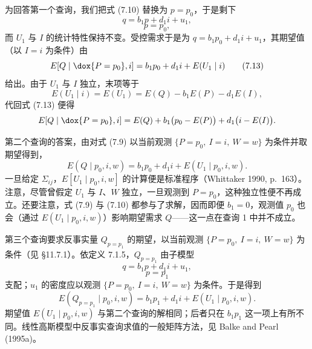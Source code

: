 为回答第一个查询，我们把式 \textup{(7.10)} 替换为 $p=p_0$，于是剩下
\begin{equation}
q=b_1p+d_1i+u_1, \tag{7.11}
\end{equation}
\begin{equation}
p=p_0, \tag{7.12}
\end{equation}
而 $U_1$ 与 $I$ 的统计特性保持不变。受控需求于是为 $q=b_1p_0+d_1i+u_1$，其期望值（以 $I=i$ 为条件）由
\begin{equation}
E[Q\mid \dox{P=p_0},i]=b_1p_0+d_1i+E(U_1\mid i) \tag{7.13}
\end{equation}
给出。由于 $U_1$ 与 $I$ 独立，末项等于
\[
E(U_1\mid i)=E(U_1)=E(Q)-b_1E(P)-d_1E(I),
\]
代回式 \textup{(7.13)} 便得
\[
E[Q\mid \dox{P=p_0},i]=E(Q)+b_1\bigl(p_0-E(P)\bigr)+d_1\bigl(i-E(I)\bigr).
\]

第二个查询的答案，由对式 \textup{(7.9)} 以当前观测 $\{P=p_0,\ I=i,\ W=w\}$ 为条件并取期望得到，
\begin{equation}
E(Q\mid p_0,i,w)=b_1p_0+d_1i+E(U_1\mid p_0,i,w). \tag{7.14}
\end{equation}
一旦给定 $\Sigma_{ij}$，$E[U_1\mid p_0,i,w]$ 的计算便是标准程序（Whittaker 1990, p.~163）。注意，尽管曾假定 $U_1$ 与 $I$、$W$ 独立，一旦观测到 $P=p_0$，这种独立性便不再成立。还要注意，式 \textup{(7.9)} 与 \textup{(7.10)} 都参与了求解，因而即便 $b_1=0$，观测值 $p_0$ 也会（通过 $E(U_1\mid p_0,i,w)$）影响期望需求 $Q$——这一点在查询 1 中并不成立。

第三个查询要求反事实量 $Q_{p=p_1}$ 的期望，以当前观测 $\{P=p_0,\ I=i,\ W=w\}$ 为条件（见 \S 11.7.1）。依定义 7.1.5，$Q_{p=p_1}$ 由子模型
\begin{equation}
q=b_1p+d_1i+u_1, \tag{7.15}
\end{equation}
\begin{equation}
p=p_1 \tag{7.16}
\end{equation}
支配；$u_1$ 的密度应以观测 $\{P=p_0,\ I=i,\ W=w\}$ 为条件。于是得到
\begin{equation}
E(Q_{p=p_1}\mid p_0,i,w)=b_1p_1+d_1i+E(U_1\mid p_0,i,w). \tag{7.17}
\end{equation}
期望值 $E(U_1\mid p_0,i,w)$ 与第二个查询的解相同；后者只在 $b_1p_1$ 这一项上有所不同。线性高斯模型中反事实查询求值的一般矩阵方法，见 Balke and Pearl (1995a)。

